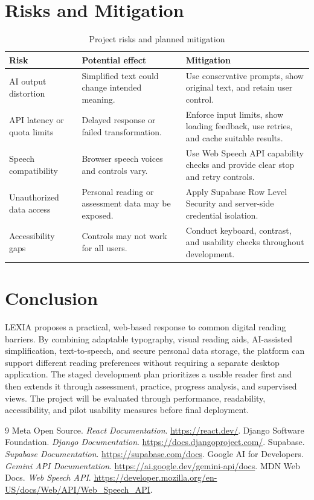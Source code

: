 \documentclass[a4paper]{tietreport}
\begin{document}
\chapter{Risks and Mitigation}
\begin{table}[H]
\centering
\begin{tabular}{p{} p{} p{}}
\toprule
\textbf{Risk} & \textbf{Potential effect} & \textbf{Mitigation} \\
\midrule
AI output distortion & Simplified text could change intended meaning. & Use conservative prompts, show original text, and retain user control. \\
API latency or quota limits & Delayed response or failed transformation. & Enforce input limits, show loading feedback, use retries, and cache suitable results. \\
Speech compatibility & Browser speech voices and controls vary. & Use Web Speech API capability checks and provide clear stop and retry controls. \\
Unauthorized data access & Personal reading or assessment data may be exposed. & Apply Supabase Row Level Security and server-side credential isolation. \\
Accessibility gaps & Controls may not work for all users. & Conduct keyboard, contrast, and usability checks throughout development. \\
\bottomrule
\end{tabular}
\caption{Project risks and planned mitigation}
\end{table}

\chapter{Conclusion}
LEXIA proposes a practical, web-based response to common digital reading barriers. By combining adaptable typography, visual reading aids, AI-assisted simplification, text-to-speech, and secure personal data storage, the platform can support different reading preferences without requiring a separate desktop application. The staged development plan prioritizes a usable reader first and then extends it through assessment, practice, progress analysis, and supervised views. The project will be evaluated through performance, readability, accessibility, and pilot usability measures before final deployment.

\begin{thebibliography}{9}
 Meta Open Source. \emph{React Documentation}. \url{https://react.dev/}.
 Django Software Foundation. \emph{Django Documentation}. \url{https://docs.djangoproject.com/}.
 Supabase. \emph{Supabase Documentation}. \url{https://supabase.com/docs}.
 Google AI for Developers. \emph{Gemini API Documentation}. \url{https://ai.google.dev/gemini-api/docs}.
 MDN Web Docs. \emph{Web Speech API}. \url{https://developer.mozilla.org/en-US/docs/Web/API/Web_Speech_API}.
\end{thebibliography}
\end{document}
